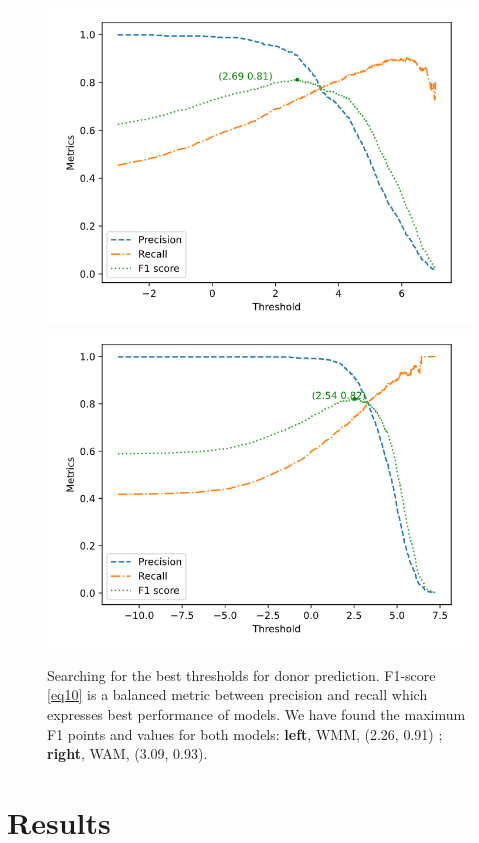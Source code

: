 \documentclass[journal,twoside]{IEEEtran}
\begin{document}
\begin{figure}[htbp]
\centerline{\includegraphics[scale=0.35]{Pics/WMM_threshold_acceptor.png}
    \includegraphics[scale=0.35]{Pics/WAM_threshold_acceptor.png}}
\caption{Searching for the best thresholds for donor prediction. F1-score  \eqref{eq10} is a balanced metric between  precision and recall which expresses best performance of models. We have found the maximum F1 points and values for both models: \textbf{left}, WMM, (2.26, 0.91) ; \textbf{right}, WAM, (3.09, 0.93). }
\label{fig8}
\end{figure}

\section{Results}\label{4}
\end{document}
